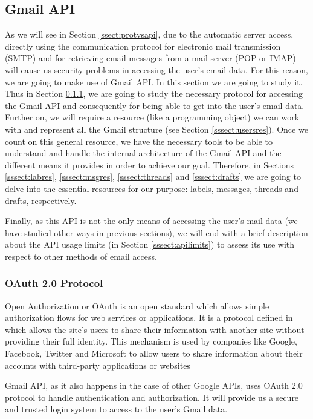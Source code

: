 \subsection{Gmail API}\label{ssect:gmailapi}
As we will see in Section \ref{ssect:protvsapi}, due to the automatic server access, directly using the communication protocol for electronic mail transmission (SMTP) and for retrieving email messages from a mail server (POP or IMAP) will cause us security problems in accessing the user's email data. For this reason, we are going to make use of Gmail API. In this section we are going to study it. Thus in Section \ref{sssect:oauth}, we are going to study the necessary protocol for accessing the Gmail API and consequently for being able to get into the user's email data. Further on, we will require a resource (like a programming object) we can work with and represent all the Gmail structure (see Section \ref{sssect:usersres}). Once we count on this general resource, we have the necessary tools to be able to understand and handle the internal architecture of the Gmail API and the different means it provides in order to achieve our goal. Therefore, in Sections \ref{sssect:labres}, \ref{sssect:msgres}, \ref{sssect:threads} and \ref{sssect:drafts} we are going to delve into the essential resources for our purpose: labels, messages, threads and drafts, respectively.

Finally, as this API is not the only means of accessing the user's mail data (we have studied other ways in previous sections), we will end with a brief description about the API usage limits (in Section \ref{sssect:apilimits}) to assess its use with respect to other methods of email access.

\subsubsection{OAuth 2.0 Protocol}\label{sssect:oauth}
Open Authorization or OAuth \citep{oauth} is an open standard which allows simple authorization flows for web services or applications. It is a protocol defined in \cite{rfc6749} which allows the site's users to share their information with another site without providing their full identity. This mechanism is used by companies like Google, Facebook, Twitter and Microsoft to allow users to share information about their accounts with third-party applications or websites

Gmail API, as it also happens in the case of other Google APIs, uses OAuth 2.0 protocol \citep{oauthforgoogle} to handle authentication and authorization. It will provide us a secure and trusted login system to access to the user's Gmail data.

